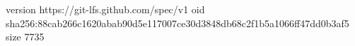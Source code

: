 version https://git-lfs.github.com/spec/v1
oid sha256:88cab266c1620abab90d5e117007ce30d3848db68c2f1b5a1066ff47dd0b3af5
size 7735
